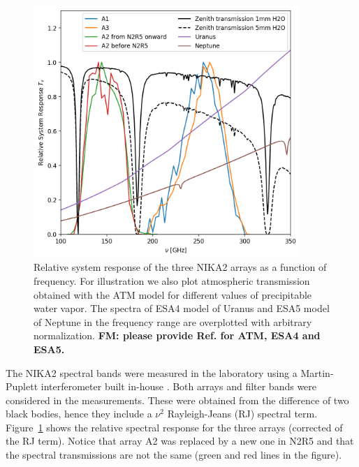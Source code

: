 

\begin{figure}[ht] %
\begin{center}
\includegraphics[width=0.9\textwidth]{Figures/SpectralBands/bandpasses_nika2.png}
\caption{Relative system response of the   three NIKA2 arrays as a
  function of frequency. For illustration we also plot atmospheric transmission obtained with the ATM model 
  for different values of precipitable water vapor. The spectra of ESA4 model of Uranus and ESA5 model of
  Neptune in the frequency range are overplotted with arbitrary
  normalization. {\bf FM: please provide Ref. for ATM, ESA4 and ESA5.}}
 \label{spectralband1}
\end{center}
\end{figure}






The NIKA2 spectral bands were measured in the laboratory using a
Martin-Puplett interferometer built in-house \cite{durand}.
Both arrays and filter bands were considered in the
measurements. These were obtained from the difference of two
black bodies, hence they include a $\nu^2$ Rayleigh-Jeans (RJ) spectral term.
Figure~\ref{spectralband1} shows the
relative spectral response for the three arrays (corrected of the RJ
term). Notice that array A2 was replaced by a new one in N2R5 and that
the spectral transmissions are not the same (green and red lines in the
figure).

